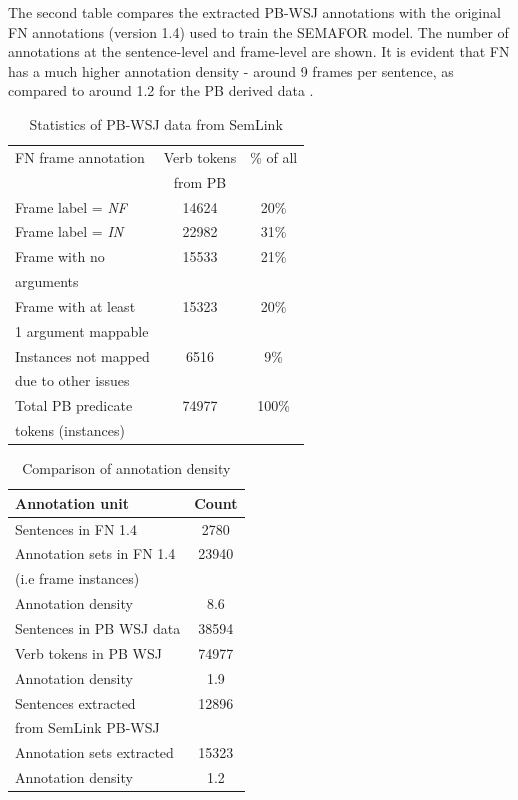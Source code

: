 \documentclass[11pt]{article}
\begin{document}
The second table compares the extracted PB-WSJ annotations with the original FN annotations (version 1.4) used to train the SEMAFOR model. The number of annotations at the sentence-level and frame-level are shown. It is evident that FN has a much higher annotation density - around 9 frames per sentence, as compared to around 1.2 for the PB derived data .


\begin{table}
\caption{Statistics of PB-WSJ data from SemLink}
\label{tab:wsjstats}
\begin{tabular}{|l|c|c|} \hline
FN frame annotation & Verb tokens & \% of all \\
& from PB & \\ \hline \hline
Frame label = \textit{NF} & 14624 & 20\%\\ \hline
Frame label = \textit{IN} & 22982 & 31\% \\ \hline
Frame with no & 15533 & 21\% \\ 
arguments  & & \\\hline
Frame with at least & 15323 & 20\% \\ 
1 argument mappable & & \\ \hline
Instances not mapped & 6516 & 9\% \\ 
due to other issues & & \\ \hline \hline
Total PB predicate & 74977 & 100\% \\
tokens (instances) & & \\ \hline
\end{tabular}
\end{table}

\begin{table}
\caption{Comparison of annotation density}
\begin{tabular}{|l|c|} \hline
\label{tab:annoUnit}
Annotation unit & Count \\\hline \hline
Sentences in FN 1.4 & 2780 \\ 
Annotation sets in FN 1.4 & 23940 \\ %
(i.e frame instances) & \\ 
Annotation density & 8.6 \\ \hline \hline
Sentences in PB WSJ data &  38594 \\ 
Verb tokens in PB WSJ & 74977 \\ 
Annotation density &  1.9 \\\hline \hline
Sentences extracted & 12896 \\ 
from SemLink PB-WSJ & \\ 
Annotation sets extracted & 15323\\ 
Annotation density & 1.2 \\ \hline 
\end{tabular}
\end{table}
\end{document}
